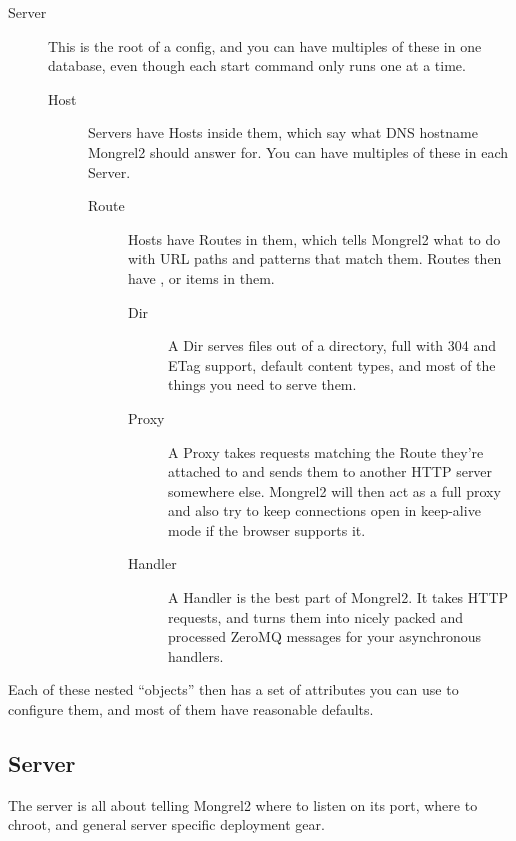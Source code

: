 \begin{description}
  \item[Server] This is the root of a config, and you can have multiples of these in one database,
    even though each start command only runs one at a time.
  \begin{description}
    \item[Host] Servers have Hosts inside them, which say what DNS hostname Mongrel2 should answer for.
      You can have multiples of these in each Server.
    \begin{description}
      \item[Route] Hosts have Routes in them, which tells Mongrel2 what to do with URL paths and patterns
        that match them.  Routes then have ,  or  items in them.
      \begin{description}
        \item[Dir] A Dir serves files out of a directory, full with 304 and ETag support, default content types,
          and most of the things you need to serve them.
        \item[Proxy] A Proxy takes requests matching the Route they're attached to and sends them to another
          HTTP server somewhere else.  Mongrel2 will then act as a full proxy and also try to keep connections
          open in keep-alive mode if the browser supports it.
        \item[Handler] A Handler is the best part of Mongrel2.  It takes HTTP requests, and turns them into
          nicely packed and processed ZeroMQ messages for your asynchronous handlers.
      \end{description}
    \end{description}
  \end{description}
\end{description}

Each of these nested ``objects'' then has a set of attributes you can use to configure them, and
most of them have reasonable defaults.


\subsection{Server}

The server is all about telling Mongrel2 where to listen on its port, where to chroot,
and general server specific deployment gear.

